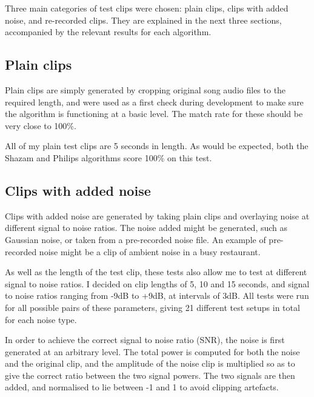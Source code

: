 \documentclass[12pt,a4paper,twoside,openright]{report}
\begin{document}
Three main categories of test clips were chosen: plain clips, clips with added noise, and re-recorded clips. They are explained in the next three sections, accompanied by the relevant results for each algorithm.


\subsection{Plain clips}

Plain clips are simply generated by cropping original song audio files to the required length, and were used as a first check during development to make sure the algorithm is functioning at a basic level. The match rate for these should be very close to 100\%.

All of my plain test clips are 5 seconds in length. As would be expected, both the Shazam and Philips algorithms score 100\% on this test.


\subsection{Clips with added noise}

Clips with added noise are generated by taking plain clips and overlaying noise at different signal to noise ratios. The noise added might be generated, such as Gaussian noise, or taken from a pre-recorded noise file. An example of pre-recorded noise might be a clip of ambient noise in a busy restaurant.

As well as the length of the test clip, these tests also allow me to test at different signal to noise ratios. I decided on clip lengths of 5, 10 and 15 seconds, and signal to noise ratios ranging from -9dB to +9dB, at intervals of 3dB. All tests were run for all possible pairs of these parameters, giving 21 different test setups in total for each noise type. 

In order to achieve the correct signal to noise ratio (SNR), the noise is first generated at an arbitrary level. The total power is computed for both the noise and the original clip, and the amplitude of the noise clip is multiplied so as to give the correct ratio between the two signal powers. The two signals are then added, and normalised to lie between -1 and 1 to avoid clipping artefacts.
\end{document}
